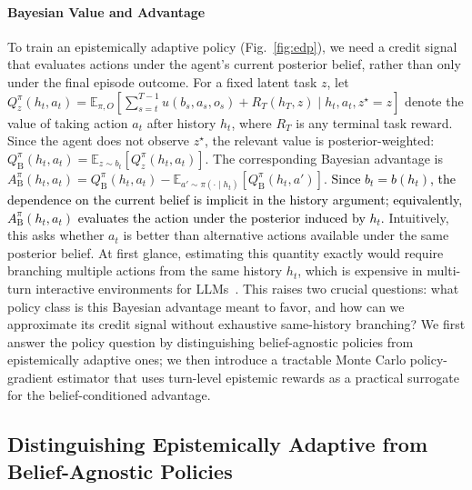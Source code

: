 \documentclass[11pt]{article}
\newcommand{\EE}{\mathbb{E}}
\newcommand{\an}[1]{\textcolor{black}{#1}}
\theoremstyle{plain}
\theoremstyle{definition}
\theoremstyle{remark}
\begin{document}
\paragraph{Bayesian Value and Advantage}
\label{ssec:bayesian_value_advantage}
To train an epistemically adaptive policy (Fig.~\ref{fig:edp}), we need a credit signal that evaluates actions under the agent's current posterior belief, rather than only under the final episode outcome. For a fixed latent task \(z\), let
\(Q_z^\pi(h_t,a_t)=\EE_{\pi,O}[\sum_{s=t}^{T-1}u(b_s,a_s,o_s)+R_T(h_T,z)\mid h_t,a_t,z^\star=z]\)
denote the value of taking action \(a_t\) after history \(h_t\), where \(R_T\) is any terminal task reward. Since the agent does not observe \(z^\star\), the relevant value is posterior-weighted: \(Q_{\mathrm{B}}^\pi(h_t,a_t)=\EE_{z\sim b_t}[Q_z^\pi(h_t,a_t)]\). The corresponding Bayesian advantage is \(A_{\mathrm{B}}^\pi(h_t,a_t)=Q_{\mathrm{B}}^\pi(h_t,a_t)-\EE_{a'\sim\pi(\cdot\mid h_t)}[Q_{\mathrm{B}}^\pi(h_t,a')]\). \an{
Since \(b_t=b(h_t)\), the dependence on the current belief is implicit in the history argument; equivalently, \(A_{\mathrm{B}}^\pi(h_t,a_t)\) evaluates the action under the posterior induced by \(h_t\).} Intuitively, this asks whether \(a_t\) is better than alternative actions available under the same posterior belief. At first glance, estimating this quantity exactly would require branching multiple actions from the same history \(h_t\), which is expensive in multi-turn interactive environments for LLMs~\citep{abdulhai2023lmrl,guo2025segment,kazemnejad2025vinepporefiningcreditassignment,zhang2025markovianreflectiveexplorationbayesadaptive}. This raises two crucial questions: what policy class is this Bayesian advantage meant to favor, and how can we approximate its credit signal without exhaustive same-history branching? We first answer the policy question by distinguishing belief-agnostic policies from epistemically adaptive ones; we then introduce a tractable Monte Carlo policy-gradient estimator that uses turn-level epistemic rewards as a practical surrogate for the belief-conditioned advantage.
\vspace{-4mm}

 \subsection{Distinguishing Epistemically Adaptive from Belief-Agnostic Policies}
\label{ssec:epistemically_adaptive_policies}
 \vspace{-3mm}
 
\end{document}
